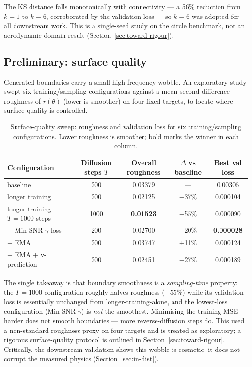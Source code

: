 The KS distance falls monotonically with connectivity --- a 56\% reduction from $k = 1$ to $k = 6$,
corroborated by the validation loss --- so $k = 6$ was adopted for all downstream work. This is a
single-seed study on the circle benchmark, not an aerodynamic-domain result
(Section~\ref{sec:toward-rigour}).

\subsection{Preliminary: surface quality}
\label{sec:surface-quality}

Generated boundaries carry a small high-frequency wobble. An exploratory study swept six
training/sampling configurations against a mean second-difference roughness of $r(\theta)$ (lower is
smoother) on four fixed targets, to locate where surface quality is controlled.

\begin{table}[t]
  \centering
  \begin{tabular}{lcccc}
    \toprule
    Configuration & Diffusion steps $T$ & Overall roughness & $\Delta$ vs baseline & Best val loss \\
    \midrule
    baseline                                        & 200  & 0.03379            & ---       & 0.00306   \\
    longer training                                 & 200  & 0.02125            & $-$37\%   & 0.000104  \\
    longer training $+$ $T=1000$ steps              & 1000 & \textbf{0.01523}   & $-$55\%   & 0.000090  \\
    $+$ Min-SNR-$\gamma$ loss \cite{hang2023minsnr} & 200  & 0.02700            & $-$20\%   & \textbf{0.000028} \\
    $+$ EMA \cite{song2020improved}                 & 200  & 0.03747            & $+$11\%   & 0.000124  \\
    $+$ EMA $+$ v-prediction \cite{salimans2022progressive} & 200 & 0.02451     & $-$27\%   & 0.000189  \\
    \bottomrule
  \end{tabular}
  \caption{Surface-quality sweep: roughness and validation loss for six training/sampling
  configurations. Lower roughness is smoother; bold marks the winner in each column.}
  \label{tab:surface-quality}
\end{table}

The single takeaway is that boundary smoothness is a \emph{sampling-time} property: the $T = 1000$
configuration roughly halves roughness ($-55\%$) while its validation loss is essentially unchanged from
longer-training-alone, and the lowest-loss configuration (Min-SNR-$\gamma$) is \emph{not} the smoothest.
Minimising the training MSE harder does not smooth boundaries --- more reverse-diffusion steps do. This
used a non-standard roughness proxy on four targets and is treated as exploratory; a rigorous
surface-quality protocol is outlined in Section~\ref{sec:toward-rigour}. Critically, the downstream
validation shows this wobble is cosmetic: it does not corrupt the measured physics
(Section~\ref{sec:in-dist}).

